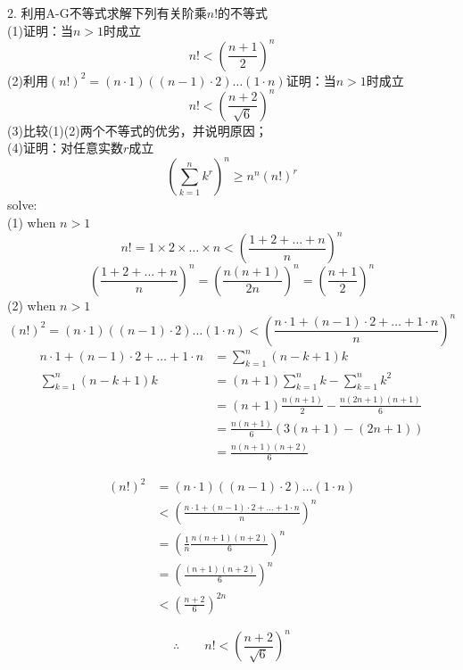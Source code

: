 \documentclass[10pt,a4paper]{book}
\begin{document}
	
	2. 利用A-G不等式求解下列有关阶乘$ n! $的不等式\\
	(1)证明：当$ n>1 $时成立
	\begin{equation}
		n!<(\frac{n+1}{2})^n 
	\end{equation}
	(2)利用$ (n!)^2 = (n\cdot 1)((n-1)\cdot 2)\dots(1\cdot n) $证明：当$ n>1 $时成立
	\begin{equation}
		n!<(\frac{n+2}{\sqrt{6}})^n
	\end{equation}
	(3)比较(1)(2)两个不等式的优劣，并说明原因；\\
	(4)证明：对任意实数$ r $成立
	\begin{equation}
		(\sum_{k=1}^n k^r)^n \ge n^n(n!)^r
	\end{equation}
	solve:\\
	(1) when $ n>1 $
	\[  n! = 1\times 2\times\dots\times n < (\frac{1+2+\dots + n}{n})^n  \]
	\[ (\frac{1+2+\dots + n}{n})^n = (\frac{n(n+1)}{2n})^n = (\frac{n+1}{2})^n \]
	(2) when $ n>1 $
	\[ (n!)^2 = (n\cdot 1)((n-1)\cdot 2)\dots(1\cdot n) < (\frac{n\cdot 1 + (n-1)\cdot 2 + \dots + 1\cdot n}{n})^n \]
	\begin{equation}
		\begin{aligned}
			n\cdot 1 + (n-1)\cdot 2 + \dots + 1\cdot n &= \sum_{k=1}^n (n-k+1)k \\
			\sum_{k=1}^n (n-k+1)k 
			&= (n+1)\sum_{k=1}^n k-\sum_{k=1}^n k^2\\
			&= (n+1)\frac{n(n+1)}{2}-\frac{n(2n+1)(n+1)}{6}\\
			&= \frac{n(n+1)}{6}(3(n+1)-(2n+1))\\
			&= \frac{n(n+1)(n+2)}{6}
		\end{aligned}
	\end{equation}
	
	\begin{equation}
		\begin{aligned}
			(n!)^2  &= (n\cdot 1)((n-1)\cdot 2)\dots(1\cdot n)\\
					&< (\frac{n\cdot 1 + (n-1)\cdot 2 + \dots + 1\cdot n}{n})^n\\
					&= (\frac{1}{n}\frac{n(n+1)(n+2)}{6})^n\\
					&= (\frac{(n+1)(n+2)}{6})^n\\
					&< (\frac{n+2}{6})^{2n}
		\end{aligned}
	\end{equation}

	\begin{equation}
		\therefore \qquad	n! < (\frac{n+2}{\sqrt{6}})^{n}
	\end{equation}
	
\end{document}
